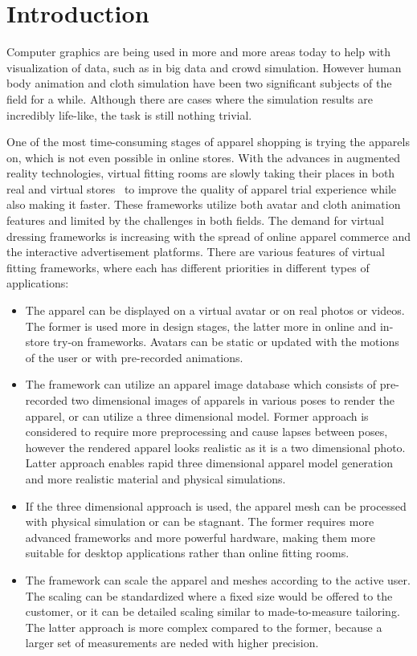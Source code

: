 \chapter{Introduction}
\label{chapter_introduction}

Computer graphics are being used in more and more areas today to help with visualization of data, such as in big data and crowd simulation. However human body animation and cloth simulation have been two significant subjects of the field for a while. Although there are cases where the simulation results are incredibly life-like, the task is still nothing trivial. 

One of the most time-consuming stages of apparel shopping is trying the apparels on, which is not even possible in online stores. With the advances in augmented reality technologies, virtual fitting rooms are slowly taking their places in both real and virtual stores~\cite{Fitnect2012,Styku2013} to improve the quality of apparel trial experience while also making it faster. These frameworks utilize both avatar and cloth animation features and limited by the challenges in both fields. The demand for virtual dressing frameworks is increasing with the spread of online apparel commerce and the interactive advertisement platforms. There are various features of virtual fitting frameworks, where each has different priorities in different types of applications:

\begin{itemize}
  \item The apparel can be displayed on a virtual avatar or on real photos or videos. The former is used more in design stages, the latter more in online and in-store try-on frameworks. Avatars can be static or updated with the motions of the user or with pre-recorded animations. 
  \item The framework can utilize an apparel image database which consists of pre-recorded two dimensional images of apparels in various poses to render the apparel, or can utilize a three dimensional model. Former approach is considered to require more preprocessing and cause lapses between poses, however the rendered apparel looks realistic as it is a two dimensional photo. Latter approach enables rapid three dimensional apparel model generation and more realistic material and physical simulations.
  \item If the three dimensional approach is used, the apparel mesh can be processed with physical simulation or can be stagnant. The former requires more advanced frameworks and more powerful hardware, making them more suitable for desktop applications rather than online fitting rooms. 
  \item The framework can scale the apparel and meshes according to the active user. The scaling can be standardized where a fixed size would be offered to the customer, or it can be detailed scaling similar to made-to-measure tailoring. The latter approach is more complex compared to the former, because a larger set of measurements are neded with higher precision.
\end{itemize}

